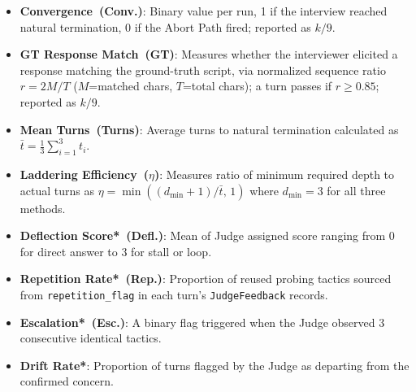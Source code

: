 \documentclass[sigconf,authordraft]{acmart}
\begin{document}
\begin{itemize}
  \item \textbf{Convergence~(Conv.)}: Binary value per run, 1 if the interview reached natural termination, 0 if the Abort Path fired; reported as $k/9$.

  \item \textbf{GT Response Match~(GT)}: Measures whether the interviewer elicited a response matching the ground-truth script, via normalized sequence ratio $r = 2M/T$ ($M$=matched chars, $T$=total chars); a turn passes if $r \geq 0.85$; reported as $k/9$.


  \item \textbf{Mean Turns~(Turns)}: Average turns to natural termination calculated as $\bar{t} = \frac{1}{3}\sum_{i=1}^{3} t_i$.

  \item \textbf{Laddering Efficiency~($\eta$)}: Measures ratio of minimum required depth to actual turns as $\eta = \min((d_{\min}+1)/\bar{t},\,1)$ where $d_{\min}=3$ for all three methods.

  \item \textbf{Deflection Score*~(Defl.)}: Mean of Judge assigned score ranging from 0 for direct answer to 3 for stall or loop.

  \item \textbf{Repetition Rate*~(Rep.)}: Proportion of reused probing tactics sourced from \texttt{repetition\_flag} in each turn's \texttt{JudgeFeedback} records.

  \item \textbf{Escalation*~(Esc.)}: A binary flag triggered when the Judge observed 3 consecutive identical tactics.

  \item \textbf{Drift Rate*}: Proportion of turns flagged by the Judge as departing from the confirmed concern.
\end{itemize}
\end{document}
